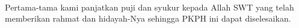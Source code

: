 \begin{acknowledgements}
\paragraph{}Pertama-tama kami panjatkan puji dan syukur kepada Allah SWT yang telah memberikan rahmat dan hidayah-Nya sehingga PKPH ini dapat diselesaikan.
\end{acknowledgements}